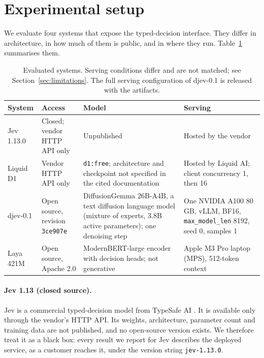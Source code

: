 \section{Experimental setup}
\label{sec:setup}

We evaluate four systems that expose the typed-decision interface. They differ
in architecture, in how much of them is public, and in where they run.
Table~\ref{tab:systems} summarises them.

\begin{table}[t]
\centering
\caption{Evaluated systems. Serving conditions differ and are not matched; see
Section~\ref{sec:limitations}. The full serving configuration of djev-0.1 is
released with the artifacts.}
\label{tab:systems}
\small
\begin{tabular}{@{}p{2.0cm}p{2.6cm}p{4.6cm}p{5.0cm}@{}}
\toprule
System & Access & Model & Serving \\
\midrule
Jev 1.13.0 & Closed; vendor HTTP API only & Unpublished & Hosted by the vendor \\
Liquid D1 & Vendor HTTP API only & \texttt{d1:free}; architecture and checkpoint not specified in the cited documentation & Hosted by Liquid AI; client concurrency 1, then 16 \\
djev-0.1 & Open source, revision \texttt{3ce907e} & DiffusionGemma 26B-A4B, a text diffusion language model (mixture of experts, 3.8B active parameters); one denoising step & One NVIDIA A100 80\,GB, vLLM, BF16, \texttt{max\_model\_len} 8192, seed 0, samples 1 \\
Laya 421M & Open source, Apache 2.0 & ModernBERT-large encoder with decision heads; not generative & Apple M3 Pro laptop (MPS), 512-token context \\
\bottomrule
\end{tabular}
\end{table}

\paragraph{Jev 1.13 (closed source).} Jev is a commercial typed-decision model
from TypeSafe AI \citep{typesafe2026jev}. It is available only through the
vendor's HTTP API. Its weights, architecture, parameter count and training data
are not published, and no open-source version exists. We therefore treat it as a
black box: every result we report for Jev describes the deployed service, as a
customer reaches it, under the version string \texttt{jev-1.13.0}.

